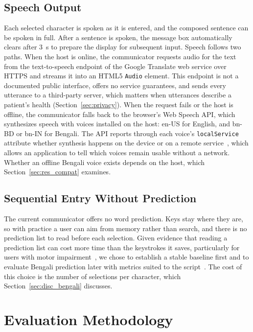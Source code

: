 \documentclass[journal]{IEEEtran}
\begin{document}
\subsection{Speech Output}
\label{sec:speech}
Each selected character is spoken as it is entered, and the composed sentence can be spoken in full. After a sentence is spoken, the message box automatically clears after 3~s to prepare the display for subsequent input. Speech follows two paths. When the host is online, the communicator requests audio for the text from the text-to-speech endpoint of the Google Translate web service over HTTPS and streams it into an HTML5 \texttt{Audio} element. This endpoint is not a documented public interface, offers no service guarantees, and sends every utterance to a third-party server, which matters when utterances describe a patient's health (Section~\ref{sec:privacy}). When the request fails or the host is offline, the communicator falls back to the browser's Web Speech API, which synthesizes speech with voices installed on the host: en-US for English, and bn-BD or bn-IN for Bengali. The API reports through each voice's \texttt{localService} attribute whether synthesis happens on the device or on a remote service~\cite{webspeech}, which allows an application to tell which voices remain usable without a network. Whether an offline Bengali voice exists depends on the host, which Section~\ref{sec:res_compat} examines.

\subsection{Sequential Entry Without Prediction}
\label{sec:noprediction}
The current communicator offers no word prediction. Keys stay where they are, so with practice a user can aim from memory rather than search, and there is no prediction list to read before each selection. Given evidence that reading a prediction list can cost more time than the keystrokes it saves, particularly for users with motor impairment~\cite{koester1994,koester1996}, we chose to establish a stable baseline first and to evaluate Bengali prediction later with metrics suited to the script~\cite{sarcar2015}. The cost of this choice is the number of selections per character, which Section~\ref{sec:disc_bengali} discusses.

\section{Evaluation Methodology}
\label{sec:method}
\end{document}
